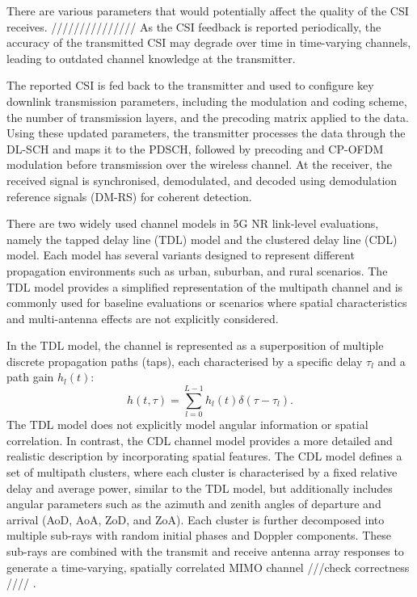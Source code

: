 \documentclass[a4paper,12pt,onecolumn]{article}
\begin{document}
	There are various parameters that would potentially affect the quality of the CSI receives. /////////////// As the CSI feedback is reported periodically, the accuracy of the transmitted CSI may degrade over time in time-varying channels, leading to outdated channel knowledge at the transmitter.
	
	The reported CSI is fed back to the transmitter and used to configure key downlink transmission parameters, including the modulation and coding scheme, the number of transmission layers, and the precoding matrix applied to the data. Using these updated parameters, the transmitter processes the data through the DL-SCH and maps it to the PDSCH, followed by precoding and CP-OFDM modulation before transmission over the wireless channel. At the receiver, the received signal is synchronised, demodulated, and decoded using demodulation reference signals (DM-RS) for coherent detection.

	
	There are two widely used channel models in 5G NR link-level evaluations, namely the tapped delay line (TDL) model and the clustered delay line (CDL) model. Each model has several variants designed to represent different propagation environments such as urban, suburban, and rural scenarios. The TDL model provides a simplified representation of the multipath channel and is commonly used for baseline evaluations or scenarios where spatial characteristics and multi-antenna effects are not explicitly considered.

	In the TDL model, the channel is represented as a superposition of multiple discrete propagation paths (taps), each characterised by a specific delay $\tau_l$ and a path gain $h_l(t)$:
	\begin{equation}
		h(t, \tau)=\sum_{l=0}^{L-1}h_l(t)\delta(\tau-\tau_l).
	\end{equation}
	The TDL model does not explicitly model angular information or spatial correlation. In contrast, the CDL channel model provides a more detailed and realistic description by incorporating spatial features. The CDL model defines a set of multipath clusters, where each cluster is characterised by a fixed relative delay and average power, similar to the TDL model, but additionally includes angular parameters such as the azimuth and zenith angles of departure and arrival (AoD, AoA, ZoD, and ZoA). Each cluster is further decomposed into multiple sub-rays with random initial phases and Doppler components. These sub-rays are combined with the transmit and receive antenna array responses to generate a time-varying, spatially correlated MIMO channel ///check correctness //// \cite{ETSI_TDL_CDL}.
	
\end{document}
